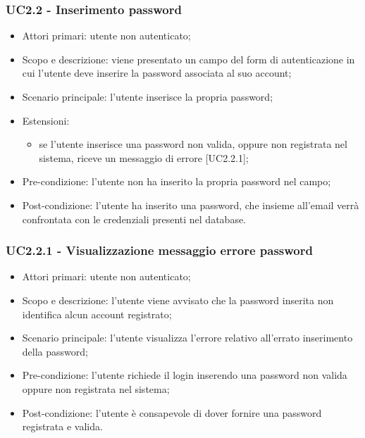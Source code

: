 \subsubsection{UC2.2 - Inserimento password}
\begin{itemize}
	\item  Attori primari: utente non autenticato;
	\item  Scopo e descrizione: viene presentato un campo del form di autenticazione in cui l'utente deve inserire la password associata al suo account;
	\item  Scenario principale: l'utente inserisce la propria password;	
	\item  Estensioni:
		   \begin{itemize}
				\item se l'utente inserisce una password non valida, oppure non registrata nel sistema, riceve un messaggio di errore [UC2.2.1];
		   \end{itemize}
	\item  Pre-condizione: l'utente non ha inserito la propria password nel campo;
	\item  Post-condizione: l'utente ha inserito una password, che insieme all'email verrà confrontata con le credenziali presenti nel database.
\end{itemize}
\subsubsection{UC2.2.1 - Visualizzazione messaggio errore password}
\begin{itemize}
	\item  Attori primari: utente non autenticato;
	\item  Scopo e descrizione: l'utente viene avvisato che la password inserita non identifica alcun account registrato;
	\item  Scenario principale: l'utente visualizza l'errore relativo all'errato inserimento della password;
	\item  Pre-condizione: l'utente richiede il login inserendo una password non valida oppure non registrata nel sistema;
	\item  Post-condizione: l'utente è consapevole di dover fornire una password registrata e valida.
\end{itemize}
